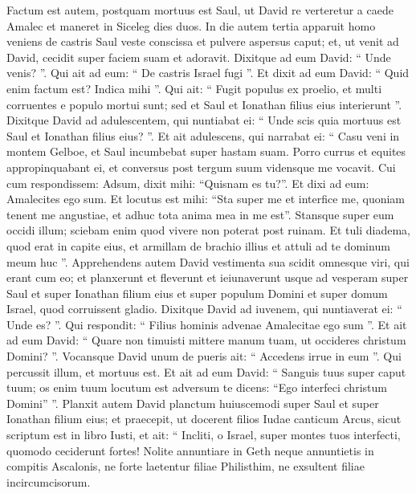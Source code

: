 \begin{biblechapter}
 \verse Factum est autem, postquam mortuus est Saul, ut David re verteretur a caede Amalec et maneret in Siceleg dies duos. 
\verse In die autem tertia apparuit homo veniens de castris Saul veste conscissa et pulvere aspersus caput; et, ut venit ad David, cecidit super faciem suam et adoravit. 
\verse Dixitque ad eum David: “ Unde venis? ”. Qui ait ad eum: “ De castris Israel fugi ”. 
\verse Et dixit ad eum David: “ Quid enim factum est? Indica mihi ”. Qui ait: “ Fugit populus ex proelio, et multi corruentes e populo mortui sunt; sed et Saul et Ionathan filius eius interierunt ”.
 \verse Dixitque David ad adulescentem, qui nuntiabat ei: “ Unde scis quia mortuus est Saul et Ionathan filius eius? ”. 
\verse Et ait adulescens, qui narrabat ei: “ Casu veni in montem Gelboe, et Saul incumbebat super hastam suam. Porro currus et equites appropinquabant ei, 
\verse et conversus post tergum suum vidensque me vocavit. Cui cum respondissem: Adsum, 
\verse dixit mihi: “Quisnam es tu?”. Et dixi ad eum: Amalecites ego sum. 
\verse Et locutus est mihi: “Sta super me et interfice me, quoniam tenent me angustiae, et adhuc tota anima mea in me est”. 
\verse Stansque super eum occidi illum; sciebam enim quod vivere non poterat post ruinam. Et tuli diadema, quod erat in capite eius, et armillam de brachio illius et attuli ad te dominum meum huc ”.
 \verse Apprehendens autem David vestimenta sua scidit omnesque viri, qui erant cum eo; 
\verse et planxerunt et fleverunt et ieiunaverunt usque ad vesperam super Saul et super Ionathan filium eius et super populum Domini et super domum Israel, quod corruissent gladio.
 \verse Dixitque David ad iuvenem, qui nuntiaverat ei: “ Unde es? ”. Qui respondit: “ Filius hominis advenae Amalecitae ego sum ”. 
\verse Et ait ad eum David: “ Quare non timuisti mittere manum tuam, ut occideres christum Domini? ”. 
\verse Vocansque David unum de pueris ait: “ Accedens irrue in eum ”. Qui percussit illum, et mortuus est. 
\verse Et ait ad eum David: “ Sanguis tuus super caput tuum; os enim tuum locutum est adversum te dicens: “Ego interfeci christum Domini” ”.
 \verse Planxit autem David planctum huiuscemodi super Saul et super Ionathan filium eius; 
\verse et praecepit, ut docerent filios Iudae canticum Arcus, sicut scriptum est in libro Iusti, et ait:
 \verse “ Incliti, o Israel, super montes tuos interfecti,
 quomodo ceciderunt fortes!
 \verse Nolite annuntiare in Geth
 neque annuntietis in compitis Ascalonis,
 ne forte laetentur filiae Philisthim,
 ne exsultent filiae incircumcisorum.

\end{biblechapter}
